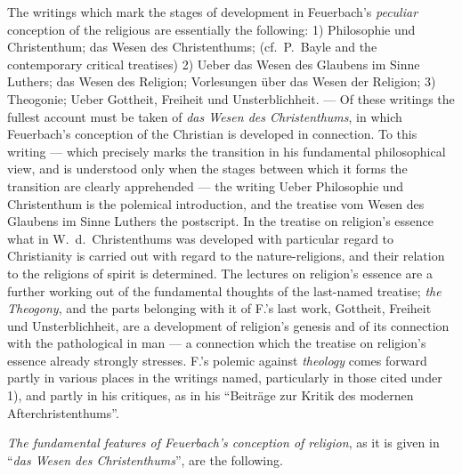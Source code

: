 \documentclass[12pt,a4paper]{book}
\begin{document}
The writings which mark the stages of development in Feuerbach's
\emph{peculiar} conception of the religious are essentially the following:
1) Philosophie und Christenthum; das Wesen des Christenthums; (cf.\ P.\ Bayle
and the contemporary critical treatises) 2) Ueber das Wesen des Glaubens im
Sinne Luthers; das Wesen des Religion; Vorlesungen über das Wesen der
Religion; 3) Theogonie; Ueber Gottheit, Freiheit und Unsterblichheit. --- Of
these writings the fullest account must be taken of \emph{das Wesen des
Christenthums}, in which Feuerbach's conception of the Christian is developed
in connection. To this writing --- which precisely marks the transition in his
fundamental philosophical view, and is understood only when the stages between
which it forms the transition are clearly apprehended --- the writing Ueber
Philosophie und Christenthum is the polemical introduction, and the treatise
vom Wesen des Glaubens im Sinne Luthers the postscript. In the treatise on
religion's essence what in W.\ d.\ Christenthums was developed with particular
regard to Christianity is carried out with regard to the nature-religions, and
their relation to the religions of spirit is determined. The lectures on
religion's essence are a
further working out of the fundamental thoughts of the last-named treatise;
\emph{the Theogony}, and the parts belonging with it of F.'s last work,
Gottheit, Freiheit und Unsterblichheit, are a development of religion's
genesis and of its connection with the pathological in man --- a connection
which the treatise on religion's essence already strongly stresses. F.'s
polemic against \emph{theology} comes forward partly in various places in the
writings named, particularly in those cited under 1), and partly in his
critiques, as in his ``Beiträge zur Kritik des modernen Afterchristenthums''.

\emph{The fundamental features of Feuerbach's conception of religion}, as it
is given in ``\emph{das Wesen des Christenthums}'', are the following.
\end{document}

